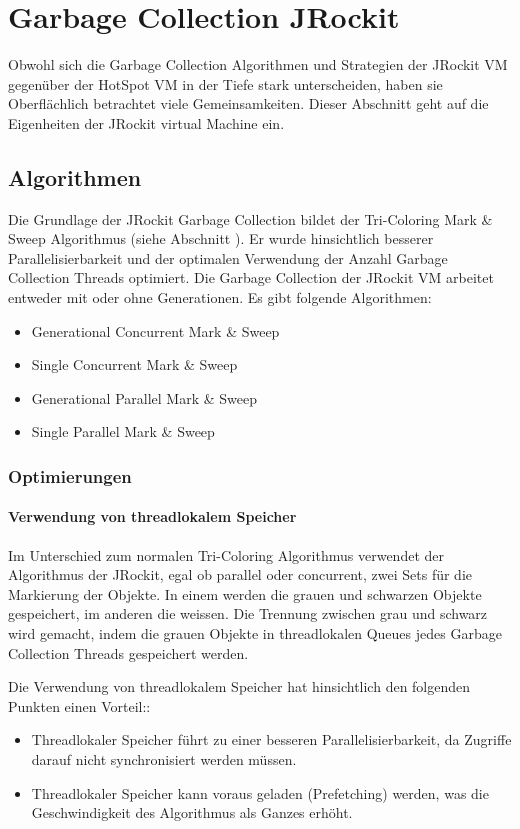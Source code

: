 \chapter{Garbage Collection JRockit}\label{jrockit garbage collection}
Obwohl sich die Garbage Collection Algorithmen und Strategien der JRockit VM gegenüber der HotSpot VM in der Tiefe stark unterscheiden, haben sie Oberflächlich betrachtet viele Gemeinsamkeiten. Dieser Abschnitt geht auf die Eigenheiten der JRockit virtual Machine ein. 

\section{Algorithmen}
Die Grundlage der JRockit Garbage Collection bildet der Tri-Coloring Mark \& Sweep Algorithmus (siehe Abschnitt ). Er wurde hinsichtlich besserer Parallelisierbarkeit und der optimalen Verwendung der Anzahl Garbage Collection Threads optimiert. Die Garbage Collection der JRockit VM arbeitet entweder mit oder ohne Generationen. Es gibt folgende Algorithmen:

\begin{itemize}
	\item Generational Concurrent Mark \& Sweep
	\item Single Concurrent Mark \& Sweep
	\item Generational Parallel Mark \& Sweep	
	\item Single Parallel Mark \& Sweep
\end{itemize}

\subsection{Optimierungen}
\subsubsection{Verwendung von threadlokalem Speicher}
Im Unterschied zum normalen Tri-Coloring Algorithmus verwendet der Algorithmus der JRockit, egal ob parallel oder concurrent, zwei Sets für die Markierung der Objekte. In einem werden die grauen und schwarzen Objekte gespeichert, im anderen die weissen. Die Trennung zwischen grau und schwarz wird gemacht, indem die grauen Objekte in threadlokalen Queues jedes Garbage Collection Threads gespeichert werden. 

Die Verwendung von threadlokalem Speicher hat hinsichtlich den folgenden Punkten einen Vorteil:\cite[S. 79]{lagergren2010oracle}:
\begin{itemize}
	\item Threadlokaler Speicher führt zu einer besseren Parallelisierbarkeit, da Zugriffe darauf nicht synchronisiert werden müssen.
	\item Threadlokaler Speicher kann voraus geladen (Prefetching) werden, was die Geschwindigkeit des Algorithmus als Ganzes erhöht.
\end{itemize}

